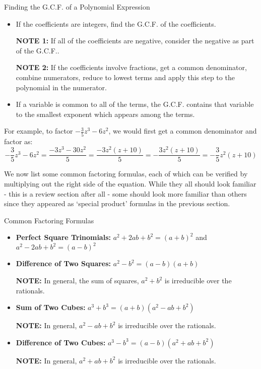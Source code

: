 \begin{floatbox}[label=box:PolynomialGCF]{Finding the G.C.F. of a Polynomial Expression}

\begin{itemize}[leftmargin=*]

\item If the coefficients are integers, find the G.C.F. of the coefficients. 

\textbf{NOTE 1:}  If all of the coefficients are negative, consider the negative as part of the G.C.F..

\textbf{NOTE 2:}  If the coefficients involve fractions, get a common denominator, combine numerators, reduce to lowest terms and apply this step to the polynomial in the numerator.

\item  If a variable is common to all of the terms, the G.C.F. contains that variable to the smallest exponent which appears among the terms.

\end{itemize}

\end{floatbox}

For example, to factor $-\frac{3}{5}z^3 - 6z^2$, we would first get a common denominator and factor as: \[ -\frac{3}{5}z^3 - 6z^2 = \frac{-3z^3 - 30z^2}{5} = \frac{-3z^2(z + 10)}{5} = -\frac{3z^2(z + 10)}{5} = -\frac{3}{5}z^{2}(z + 10)\]

We now list some common factoring formulas, each of which can be verified by multiplying out the right side of the equation.  While they all should look familiar - this is a review section after all - some should look more familiar than others since they appeared as `special product' formulas in the previous section.  

\begin{floatbox}[label=box:CommonFactoringFormulas]{Common Factoring Formulas}

\begin{itemize}[leftmargin=*]

\item \textbf{Perfect Square Trinomials:}  $a^2 + 2ab + b^2 = (a+b)^2$ and $a^2 - 2ab + b^2 = (a-b)^2$
\item  \textbf{Difference of Two Squares:}  $a^2 - b^2 = (a-b)(a+b)$

\textbf{NOTE:}  In general, the sum of squares, $a^2 + b^2$ is irreducible over the rationals.

\item  \textbf{Sum of Two Cubes:}  $a^3 + b^3 = (a + b)(a^2 - ab + b^2)$

\textbf{NOTE:}  In general, $a^2 - ab + b^2$ is irreducible over the rationals.

\item   \textbf{Difference of Two Cubes:}  $a^3 - b^3 = (a - b)(a^2 + ab + b^2)$ 

\textbf{NOTE:}  In general, $a^2 + ab + b^2$ is irreducible over the rationals.
\end{itemize}

\end{floatbox}

